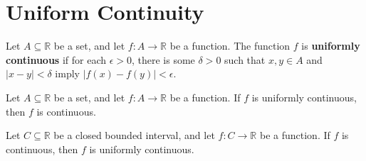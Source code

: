 \section{Uniform Continuity}
\begin{definition}
	\label{definition-3.4.1}
	Let $A \subseteq \mathbb{R}$ be a set, and let $f : A \to \mathbb{R}$ be a function. The function $f$ is \textbf{uniformly continuous} if for each $\epsilon > 0$, there is some $\delta > 0$ such that $x,y \in A$ and $\left| x-y\right| < \delta$ imply $\left| f(x)-f(y) \right| < \epsilon$.
\end{definition}
\begin{lemma}
	\label{lemma-3.4.2}
	Let $A \subseteq \mathbb{R}$ be a set, and let $f : A \to \mathbb{R}$ be a function. If $f$ is uniformly continuous, then $f$ is continuous.
\end{lemma}
\setcounter{theorem}{3}
\begin{theorem}
	\label{theorem-3.4.4}
	Let $C \subseteq \mathbb{R}$ be a closed bounded interval, and let $f : C \to \mathbb{R}$ be a function. If $f$ is continuous, then $f$ is uniformly continuous.
\end{theorem}
